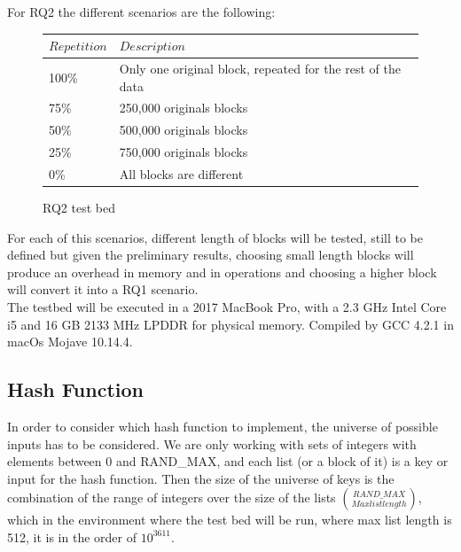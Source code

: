 \documentclass[a4paper,12pt]{article}
\begin{document}
For RQ2 the different scenarios are the following:
\\
\begin{figure}[H]
\centering
\begin{tabular}{|l|l|} \toprule
	{$Repetition $} & {$Description$}  \\ \midrule
	100\% & Only one  original block, repeated for the rest of the data \\
	75\% & 250,000 originals blocks   \\
	50\% & 500,000 originals blocks \\
	25\% & 750,000 originals blocks \\
	0\% & All blocks are different \\ \midrule
\end{tabular}
\caption{RQ2 test bed}
\end{figure}

For each of this scenarios, different length of blocks will be tested, still to be defined but given the preliminary results, choosing small length blocks will produce an overhead in memory and in operations and choosing a higher block will convert it into a RQ1 scenario. \\

The testbed will be executed in a 2017 MacBook Pro, with a 2.3 GHz Intel Core i5 and 16 GB 2133 MHz LPDDR for physical memory. Compiled by GCC 4.2.1 in macOs Mojave 10.14.4.


\subsection{Hash Function}

In order to consider which hash function to implement, the universe of possible inputs has to be considered. We are only working with sets of integers with elements between 0 and RAND\_MAX, and each list (or a block of it) is a key or input for the hash function. 
Then the size of the universe of keys is the combination of the range of integers over the size of the lists $\binom{RAND\_MAX}{Max list length} $, which in the environment where the test bed will be run, where max list length is 512, it is in the order of $10^{3611}$.
\end{document}
